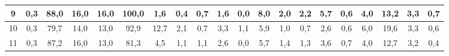 \begin{sidewaystable}[]
\begin{tabular}{|c|c|c|c|c|c|c|c|c|c|c|c|c|c|c|c|c|c|c|c|}
    9  & 0,3                                              & 88,0                                            & 16,0                                            & 16,0                                            & 100,0                                           & 1,6                                             & 0,4                                             & 0,7                                             & 1,6                                             & 0,0                                             & 8,0                                              & 2,0                                              & 2,2                                              & 5,7                                              & 0,6                                              & 4,0                                              & 13,2                                             & 3,3                                              & 0,7                                              \\ \hline
    10 & 0,3                                              & 79,7                                            & 14,0                                            & 13,0                                            & 92,9                                            & 12,7                                            & 2,1                                             & 0,7                                             & 3,3                                             & 1,1                                             & 5,9                                              & 1,0                                              & 0,7                                              & 2,6                                              & 0,6                                              & 6,0                                              & 19,6                                             & 3,3                                              & 0,6                                              \\ \hline
    11 & 0,3                                              & 87,2                                            & 16,0                                            & 13,0                                            & 81,3                                            & 4,5                                             & 1,1                                             & 1,1                                             & 2,6                                             & 0,0                                             & 5,7                                              & 1,4                                              & 1,3                                              & 3,6                                              & 0,7                                              & 4,0                                              & 12,7                                             & 3,2                                              & 0,4                                              \\ \hline

\end{tabular}
\end{sidewaystable}
